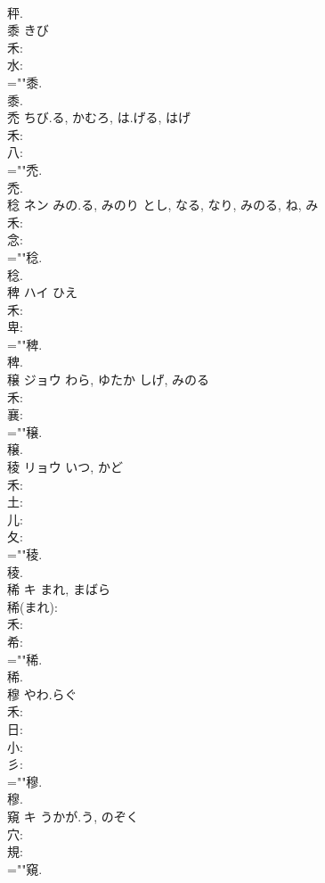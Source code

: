 \documentclass[8pt]{extreport}
\begin{document}
\begin{CJK}{UTF8}{min}
\\	秤.
\\	黍		きび				
\\	禾: 
\\	水: 
\\	=""黍.
\\	黍.
\\	禿		ちび.る, かむろ, は.げる, はげ				
\\	禾: 
\\	八: 
\\	=""禿.
\\	禿.
\\	稔	ネン	みの.る, みのり	とし, なる, なり, みのる, ね, み	
\\	禾: 
\\	念: 
\\	=""稔.
\\	稔.
\\	稗	ハイ	ひえ		
\\	禾: 
\\	卑: 
\\	=""稗.
\\	稗.
\\	穣	ジョウ	わら, ゆたか	しげ, みのる	
\\	禾: 
\\	襄: 
\\	=""穣.
\\	穣.
\\	稜	リョウ	いつ, かど		
\\	禾: 
\\	土: 
\\	儿: 
\\	夂: 
\\	=""稜.
\\	稜.
\\	稀	キ	まれ, まばら		
\\	稀(まれ): 
\\	禾: 
\\	希: 
\\	=""稀.
\\	稀.
\\	穆		やわ.らぐ				
\\	禾: 
\\	日: 
\\	小: 
\\	彡: 
\\	=""穆.
\\	穆.
\\	窺	キ	うかが.う, のぞく		
\\	穴: 
\\	規: 
\\	=""窺.

\end{CJK}
\end{document}

